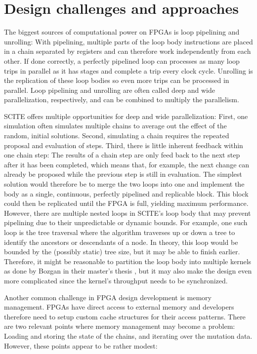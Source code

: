 \section{Design challenges and approaches}

The biggest sources of computational power on \acp{FPGA} is loop pipelining and unrolling: With pipelining, multiple parts of the loop body instructions are placed in a chain separated by registers and can therefore work independently from each other. If done correctly, a perfectly pipelined loop can processes as many loop trips in parallel as it has stages and complete a trip every clock cycle. Unrolling is the replication of these loop bodies so even more trips can be processed in parallel. Loop pipelining and unrolling are often called deep and wide parallelization, respectively, and can be combined to multiply the parallelism.

\ac{SCITE} offers multiple opportunities for deep and wide parallelization: First, one simulation often simulates multiple chains to average out the effect of the random, initial solutions. Second, simulating a chain requires the repeated proposal and evaluation of steps. Third, there is little inherent feedback within one chain step: The results of a chain step are only feed back to the next step after it has been completed, which means that, for example, the next change can already be proposed while the previous step is still in evaluation. The simplest solution would therefore be to merge the two loops into one and implement the body as a single, continuous, perfectly pipelined and replicable block. This block could then be replicated until the \ac{FPGA} is full, yielding maximum performance. However, there are multiple nested loops in \ac{SCITE}'s loop body that may prevent pipelining due to their unpredictable or dynamic bounds. For example, one such loop is the tree traversal where the algorithm traverses up or down a tree to identify the ancestors or descendants of a node. In theory, this loop would be bounded by the (possibly static) tree size, but it may be able to finish earlier. Therefore, it might be reasonable to partition the loop body into multiple kernels as done by Bozgan in their master's thesis \cite{bozgan_2019}, but it may also make the design even more complicated since the kernel's throughput needs to be synchronized.

Another common challenge in \ac{FPGA} design development is memory management. \acp{FPGA} have direct access to external memory and developers therefore need to setup custom cache structures for their access patterns. There are two relevant points where memory management may become a problem: Loading and storing the state of the chains, and iterating over the mutation data. However, these points appear to be rather modest:

